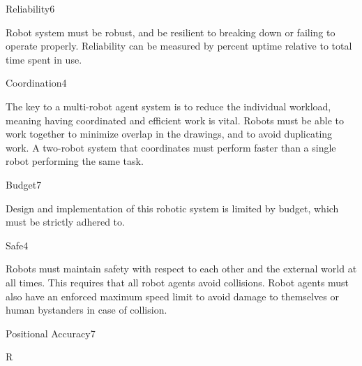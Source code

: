 {\begin{nonfunctional_requirement}{Reliability}{6}
\item Robot system must be robust, and be resilient to breaking down or failing to operate properly. Reliability can be measured by percent uptime relative to total time spent in use.
\end{nonfunctional_requirement}


\begin{nonfunctional_requirement}{Coordination}{4}
\item The key to a multi-robot agent system is to reduce the individual workload, meaning having coordinated and efficient work is vital. Robots must be able to work together to minimize overlap in the drawings, and to avoid duplicating work. A two-robot system that coordinates must perform faster than a single robot performing the same task.
\end{nonfunctional_requirement}

\begin{nonfunctional_requirement}{Budget}{7}
\label{nfr:budget}
\item Design and implementation of this robotic system is limited by budget, which must be strictly adhered to. 
\end{nonfunctional_requirement}

\begin{nonfunctional_requirement}{Safe}{4}
\label{nfr:safe}
\item Robots must maintain safety with respect to each other and the external world at all times. This requires that all robot agents avoid collisions. Robot agents must also have an enforced maximum speed limit to avoid damage to themselves or human bystanders in case of collision. 
\end{nonfunctional_requirement}

\begin{nonfunctional_requirement}{Positional Accuracy}{7}
\label{nfr:pos_accuracy}
\item R
\end{nonfunctional_requirement}

}
